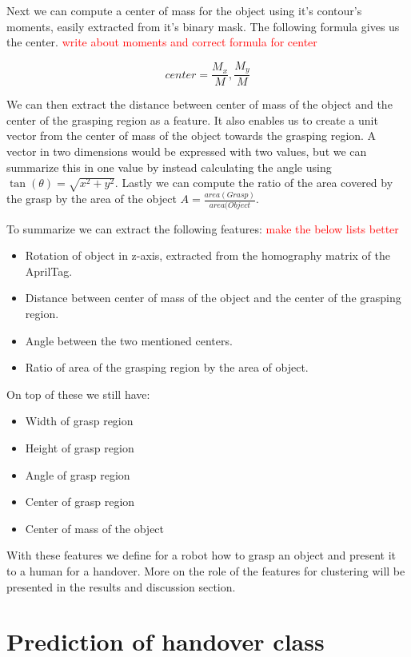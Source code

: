 Next we can compute a center of mass for the object using it's contour's moments, easily extracted from it's binary mask. The following formula gives us the center. \textcolor{red}{write about moments and correct formula for center}

\[
	center = \frac{M_x}{M}, \frac{M_y}{M}
\]

We can then extract the distance between center of mass of the object and the center of the grasping region as a feature. It also enables us to create a unit vector from the center of mass of the object towards the grasping region. A vector in two dimensions would be expressed with two values, but we can summarize this in one value by instead calculating the angle using \(\tan(\theta) = \sqrt{x^2 + y^2}\). Lastly we can compute the ratio of the area covered by the grasp by the area of the object \(A = \frac{area(Grasp)}{area(Object}\).

To summarize we can extract the following features: \textcolor{red}{make the below lists better}
\begin{itemize}
	\item Rotation of object in z-axis, extracted from the homography matrix of the AprilTag.
	\item Distance between center of mass of the object and the center of the grasping region.
	\item Angle between the two mentioned centers.
	\item Ratio of area of the grasping region by the area of object.
\end{itemize}

On top of these we still have:
\begin{itemize}
	\item Width of grasp region
	\item Height of grasp region
	\item Angle of grasp region
	\item Center of grasp region
	\item Center of mass of the object
\end{itemize}

With these features we define for a robot how to grasp an object and present it to a human for a handover. More on the role of the features for clustering will be presented in the results and discussion section.


\section{Prediction of handover class}

